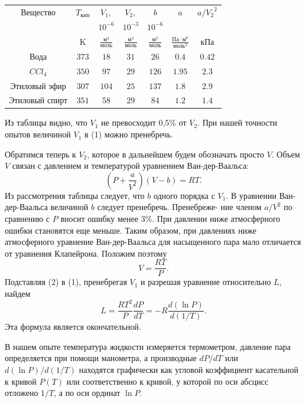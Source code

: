 \documentclass[20pt]{article}
\begin{document}
\noindent
\begin{tabular}{|c|c|c|c|c|c|c|}
\hline Вещество &  $T_{\text{кип}}$ & $V_1,$ & $V_2,$ & $b$ & $a$ & $a/{V_2}^2$ \\
 &  & $10^{-6}$ & $10^{-3}$ & $10^{-6}$ & & \\
 & K & $\frac{\text{м}^3}{\text{моль}}$ & $\frac{\text{м}^3}{\text{моль}}$ &
 $\frac{\text{м}^3}{\text{моль}}$ & $\frac{\text{Па} \cdot \text{м}^6}{\text{моль}^2}$ & кПа \\
\hline Вода & $373$ & $18$ & $31$ & $26$ & $0.4$ & $0.42$ \\
$CCl_4$ & $350$ & $97$ & $29$ & $126$ & $1.95$ & $2.3$ \\
Этиловый эфир & $307$ & $104$ & $25$ & $137$ & $1.8$ & $2.9$ \\
Этиловый спирт & $351$ & $58$ & $29$ & $84$ & $1.2$ & $1.4$ \\
\hline
\end{tabular}


Из таблицы видно, что $V_1$ не превосходит 0,5\% от $V_2$. При нашей
точности опытов величиной $V_1$ в (1) можно пренебречь.

Обратимся теперь к $V_2$, которое в дальнейшем будем обозначать
просто $V$. Объем $V$ связан с давлением и температурой уравнением
Ван-дер-Ваальса:
\[
	\left( P + \frac{a}{V^2} \right) \left( V - b \right) = RT.
\]
Из рассмотрения таблицы следует, что $b$ одного порядка с $V_1$. В уравнении Ван-дер-Ваальса величиной $b$ следует пренебречь. Пренебреже-
ние членом $a/V^2$ по сравнению с $P$ вносит ошибку менее 3\%. При давлении ниже атмосферного ошибки становятся еще меньше. Таким образом, при давлениях ниже атмосферного уравнение Ван-дер-Ваальса для насыщенного пара мало отличается от уравнения Клапейрона.
Положим поэтому
\begin{equation}
	V = \frac{RT}{P}.
\end{equation}
Подставляя (2) в (1), пренебрегая $V_1$ и разрешая уравнение относительно
$L$, найдем
\[
	L = \frac{RT^2}{P} \frac{dP}{dT} = -R \frac{d(\ln P)}{d(1/T)}.
\]
Эта формула является окончательной.

В нашем опыте температура жидкости измеряется термометром, давление пара определяется при помощи манометра, а производные $dP/dT$ или $d(\ln P)/d(1/T)$ находятся графически как угловой коэффициент касательной к кривой $P(T)$ или соответственно к кривой, у которой по оси абсцисс отложено $1/T$, а по оси ординат $\ln P$.
\end{document}
